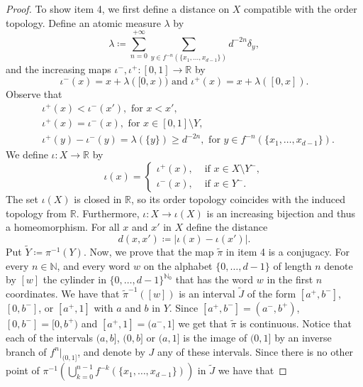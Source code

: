 \documentclass[12pt]{amsart}
\numberwithin{equation}{section} %
\numberwithin{figure}{section} %
\theoremstyle{plain}
\theoremstyle{definition}
\theoremstyle{remark}
\theoremstyle{citing}
\newcommand{\N}{\mathbb{N}}
\newcommand{\R}{\mathbb{R}}
\renewcommand{\=}{\coloneqq}
\begin{document}
\begin{proof}
    To show item 4, we first define a distance on $X$ compatible with the order topology. Define an atomic measure $\lambda$ by 
    \begin{equation}
        \lambda \= \sum_{n=0}^{+\infty} \sum_{y\in f^{-n}(\{x_1,\ldots,x_{d-1}\})} d^{-2n}\delta_y,
    \end{equation}
    and the increasing maps $\iota^-,\iota^+: [0,1]\to\R$ by
    \begin{equation}
        \iota^-(x)= x + \lambda([0,x)) \text{ and } \iota^+(x)= x + \lambda([0,x]).
    \end{equation}
    Observe that 
    \begin{equation*}
        \begin{split}
        &\iota^+(x) < \iota^-(x'), \text{ for } x<x',\\
        & \iota^+(x) = \iota^-(x), \text{ for } x\in[0,1]\setminus Y,\\
        & \iota^+(y) - \iota^{-}(y) = \lambda(\{y\}) \geq d^{-2n}, \text{ for } y\in f^{-n}(\{x_1,\ldots,x_{d-1}\}).
        \end{split}
    \end{equation*}
    We define $\iota:X\to\R$ by 
    \begin{equation}
        \iota(x) = \begin{cases}
            \iota^+(x), & \text{ if }x\in X\setminus Y^{-},\\
            \iota^-(x), & \text{ if }x\in Y^-.
        \end{cases}
    \end{equation}
    The set $\iota(X)$ is closed in $\R$, so its order topology coincides with the induced topology from $\R$. Furthermore, $\iota: X\to\iota(X)$ is an increasing bijection and thus a homeomorphism. For all $x$ and $x'$ in $X$ define the distance 
    \begin{equation}
        d(x,x')\=|\iota(x) - \iota(x')|. 
    \end{equation}
    Put $\widetilde{Y}\= \pi^{-1}(Y)$. Now, we prove that the map $\widetilde{\pi}$ in item 4 is a conjugacy. For every $n\in\N$, and every word $w$ on the alphabet $\{0,\ldots,d-1\}$ of length $n$ denote by $[w]$ the cylinder in $\{0,\ldots,d-1\}^{\N_0}$ that has the word $w$ in the first $n$ coordinates. We have that $\widetilde{\pi}^{-1}([w])$ is an interval $\widetilde{J}$ of the form $[a^+,b^-]$, $[0,b^-]$, or $[a^+,1]$ with $a$ and $b$ in $Y$. Since $[a^+,b^-] = (a^-,b^+)$, $[0,b^-]=[0,b^+)$ and $[a^+,1] = (a^-,1]$ we get that $\widetilde{\pi}$ is continuous. Notice that each of the intervals $(a,b]$, $(0,b]$ or $(a,1]$ is the image of $(0,1]$ by an inverse branch of $f^n|_{(0,1]}$, and denote by $J$ any of these intervals. Since there is no other point of $\pi^{-1}\left( \bigcup_{k=0}^{n-1} f^{-k}(\{x_1,\ldots,x_{d-1}\})\right)$ in $\widetilde{J}$ we have that

\end{proof}
\end{document}
